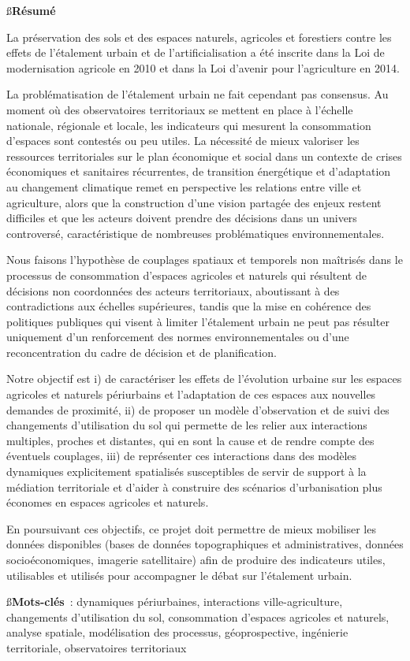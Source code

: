 {\ss\bf Résumé}

La préservation des sols et des espaces naturels, agricoles et forestiers
contre les effets de l'étalement urbain et de l'artificialisation
a été inscrite dans la Loi de modernisation agricole en 2010
et dans la Loi d'avenir pour l'agriculture en 2014.

La problématisation de l'étalement urbain ne fait cependant pas consensus.
Au moment où des observatoires territoriaux
se mettent en place à l'échelle nationale, régionale et locale,
les indicateurs qui mesurent la consommation d'espaces sont contestés ou peu utiles.
La nécessité de mieux valoriser les ressources territoriales sur le plan économique
et social dans un contexte de crises économiques et sanitaires récurrentes,
de transition énergétique et d'adaptation au changement climatique
remet en perspective les relations entre ville et agriculture,
alors que la construction d'une vision partagée des enjeux restent difficiles
et que les acteurs doivent prendre des décisions dans un univers controversé,
caractéristique de nombreuses problématiques environnementales.

Nous faisons l'hypothèse de couplages spatiaux et temporels non maîtrisés dans le processus
de consommation d'espaces agricoles et naturels
qui résultent de décisions non coordonnées des acteurs territoriaux,
aboutissant à des contradictions aux échelles supérieures,
tandis que la mise en cohérence des politiques publiques
qui visent à limiter l'étalement urbain ne peut pas résulter uniquement
d'un renforcement des normes environnementales ou d'une reconcentration
du cadre de décision et de planification.

Notre objectif est i) de caractériser les effets de l'évolution urbaine sur les espaces
agricoles et naturels périurbains et l'adaptation de ces espaces aux nouvelles demandes de proximité,
ii) de proposer un modèle d'observation et de suivi des changements d'utilisation du sol
qui permette de les relier aux interactions multiples, proches et distantes,
qui en sont la cause et de rendre compte des éventuels couplages,
iii) de représenter ces interactions dans des modèles dynamiques explicitement spatialisés
susceptibles de servir de support à la médiation territoriale 
et d'aider à construire des scénarios d'urbanisation
plus économes en espaces agricoles et naturels.

En poursuivant ces objectifs,
ce projet doit permettre de mieux mobiliser les données disponibles
(bases de données topographiques et administratives, données socioéconomiques,
imagerie satellitaire) afin de produire des indicateurs
utiles, utilisables et utilisés pour accompagner le débat
sur l'étalement urbain.

\blank[2*big]

{\ss\bf Mots-clés} :
dynamiques périurbaines, interactions ville-agriculture,
changements d'utilisation du sol, consommation d'espaces agricoles et naturels,
analyse spatiale, modélisation des processus,
géoprospective, ingénierie territoriale, observatoires territoriaux